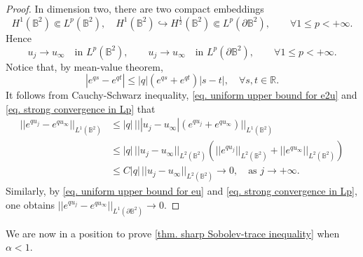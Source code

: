 \documentclass[11pt,a4paper,twoside]{amsart}
\newtheorem{sketch proof}{Sketch of the proof}[section]
\begin{document}
\begin{proof}
        In dimension two, there are two compact embeddings
        \[
        H^1(\mathbb{B}^2)\Subset L^p(\mathbb{B}^2),\quad 
        H^1(\mathbb{B}^2)\hookrightarrow
        H^{\frac{1}{2}}(\mathbb{B}^2)
        \Subset L^p(\partial \mathbb{B}^2),\qquad 
        \forall 1\leq p<+\infty.
        \]
        Hence 
        \begin{equation}\label{eq. strong convergence in Lp}
            u_j\to u_\infty \quad \text{in }L^p(\mathbb{B}^2),\qquad 
        u_j\to u_\infty \quad \text{in }L^p(\partial \mathbb{B}^2),
        \qquad 
        \forall 1\leq p<+\infty.
        \end{equation}
        Notice that, by mean-value theorem,
        \[
        |e^{qs}-e^{qt}|
        \leq |q|(e^{qs}+e^{qt})|s-t|,\quad 
        \forall s,t\in\mathbb{R}.
        \]
        It follows from  Cauchy-Schwarz inequality, \cref{eq. uniform upper bound for e2u} and \cref{eq. strong convergence in Lp} that
        \begin{align*}
            ||e^{qu_j}-e^{qu_\infty}||
            _{L^1(\mathbb{B}^2)}
            &\leq |q|\,
            \big|\big||u_j-u_\infty|(e^{qu_j}+e^{qu_\infty})\big|\big|
            _{L^1(\mathbb{B}^2)}\\[2mm]
            &\leq |q|\, 
            ||u_j-u_\infty||_{L^2(\mathbb{B}^2)}
            \left(
            ||e^{qu_j}||_{L^2(\mathbb{B}^2)}
            +||e^{qu_\infty}||_{L^2(\mathbb{B}^2)}
            \right)\\[2mm]
            &\leq C|q|\, 
            ||u_j-u_\infty||
            _{L^2(\mathbb{B}^2)}  \to 0,
            \quad \text{as }j\to+\infty.
        \end{align*}
        Similarly, by \cref{eq. uniform upper bound for eu} and \cref{eq. strong convergence in Lp}, one obtains
        $||e^{qu_j}- e^{qu_\infty}||_{L^1(\partial \mathbb{B}^2)}\to 0.$
    \end{proof}
We are now in a position to prove  \cref{thm. sharp Sobolev-trace inequality} when $\alpha<1$. 
\end{document}
